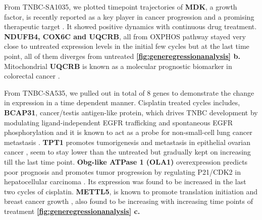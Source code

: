 From TNBC-SA1035, we plotted timepoint trajectories of \textbf{MDK}, a growth factor, is recently reported as a key player in cancer progression and a promising therapeutic target \cite{filippou2020midkine}. It showed positive dynamics with continuous drug treatment. 
\textbf{NDUFB4, COX6C and UQCRB}, all from \ac{OXPHOS} pathway stayed very close to untreated expression levels in the initial few cycles but at the last time point, all of them diverges from untreated \textbf{\autoref{fig:generegressionanalysis} b.} Mitochondrial \textbf{UQCRB} is known as a molecular prognostic biomarker in colorectal cancer \cite{kim2017mitochondrial}.

From TNBC-SA535, we pulled out in total of 8 genes to demonstrate the change in expression in a time dependent manner. Cisplatin treated cycles includes, \textbf{BCAP31}, cancer/testis antigen-like protein, which drives TNBC development by modulating ligand-independent EGFR trafficking and spontaneous EGFR phosphorylation and it is known to act as a probe for non-small-cell lung cancer metastasis
\cite{fu2019bcap31, wang2020bcap31}. \textbf{TPT1} promotes tumorigenesis and metastasis in epithelial ovarian cancer \cite{wu2019lncrna}, seem to stay lower than the untreated but gradually kept on increasing till the last time point. \textbf{Obg-like ATPase 1 (OLA1)} overexpression predicts poor prognosis and promotes tumor progression by regulating P21/CDK2 in hepatocellular carcinoma \cite{huang2020obg}. Its expression was found to be increased in the last two cycles of cisplatin. \textbf{METTL5}, is known to promote translation initiation and breast cancer growth \cite{zeng2020roles}, also found to be increasing with increasing time points of treatment \textbf{\autoref{fig:generegressionanalysis} c.}

